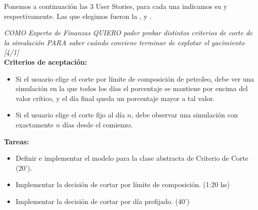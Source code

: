 Ponemos a continuación las 3 User Stories, para cada una indicamos su
\BV{} y \SP{} respectivamente. Las que elegimos fueron la ,  y . \\

\begin{tcolorbox}
\textit{ COMO Experto de Finanzas QUIERO poder probar distintos criterios de corte de la simulación PARA saber cuándo conviene terminar de explotar el yacimiento [4/1]}\\

\textbf{Criterios de aceptación:}
\begin{itemize}
	\item Si el usuario elige el corte por límite de composición de petroleo, debe ver una simulación en la que todos los días el porcentaje se mantiene por encima del valor crítico, y el día final queda un porcentaje mayor a tal valor.
    \item Si el usuario elige el corte fijo al día $n$, debe observar una simulación con exactamente $n$ días desde el comienzo.
\end{itemize}

\textbf{Tareas:}
\begin{itemize}
	\item Definir e implementar el modelo para la clase abstracta de
    Criterio de Corte (20').
    \item Implementar la decisión de cortar por límite de composición. (1:20 hs)
    \item Implementar la decisión de cortar por día prefijado. (40')
\end{itemize}
\end{tcolorbox}

